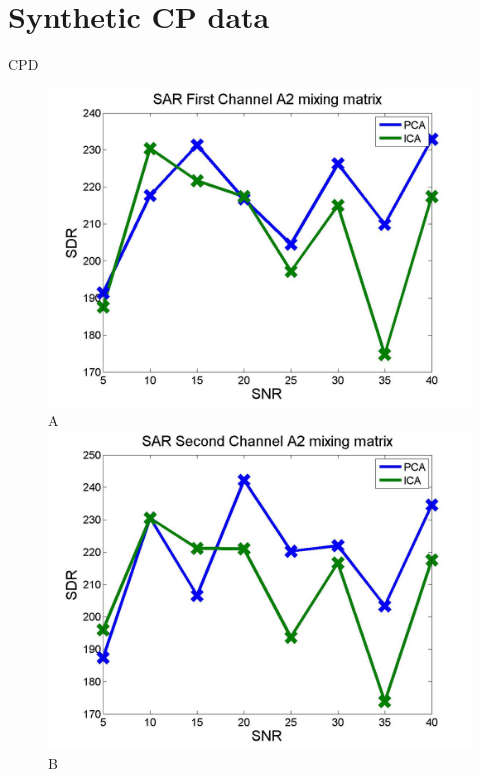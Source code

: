 \documentclass[t,12pt,english
\ifx\beamermode\undefined\else,\beamermode\fi
]{beamer}
\begin{document}
\section{Synthetic CP data}

\begin{frame}{CPD}
\begin{figure}[!htbp]
%
\centering
\includegraphics[width=1\textwidth]{11.jpg}\\
\tiny{A}
\endminipage\hfill
{}%
\centering
\includegraphics[width=1\textwidth]{12.jpg}\\
\tiny{B}
\endminipage\hfill
{}%
\centering

\end{figure}
\end{frame}
\end{document}
